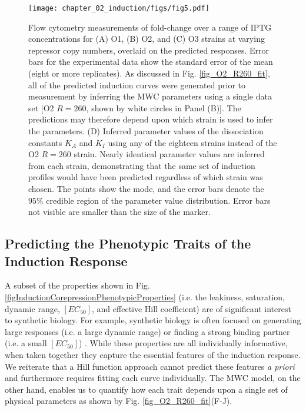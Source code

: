 \begin{figure}[h]
	\centering \texttt{[image: chapter\_02\_induction/figs/fig5.pdf]}
	\caption[Comparison of predictions against measured and inferred data.]{
	Flow cytometry measurements of fold-change over a range of IPTG concentrations
	for (A) O1, (B) O2, and (C) O3 strains at
	varying repressor copy numbers, overlaid on the predicted responses. Error bars
	for the experimental data show the standard error of the mean (eight or more
	replicates). As discussed in Fig. \ref{fig_O2_R260_fit}, all of the predicted
	induction curves were generated prior to measurement by inferring the MWC
	parameters using a single data set [O2 $R=260$, shown by white circles in Panel
	(B)]. The predictions may therefore depend upon which strain is used to
	infer the parameters. (D) Inferred parameter values of the
	dissociation constants $K_A$ and $K_I$ using any of the eighteen strains
	instead of the O2 $R=260$ strain. Nearly identical parameter values are
	inferred from each strain, demonstrating that the same set of induction
	profiles would have been predicted regardless of which strain was chosen. The
	points show the mode, and the error bars denote the $95\%$ credible region of
	the parameter value distribution. Error bars not visible are smaller than the
	size of the marker.} 
	\label{fig_O2_R260_pred_data}
\end{figure}

\subsection{Predicting the Phenotypic Traits of the Induction Response}
A subset of the
properties shown in Fig. \ref{figInductionCorepressionPhenotypicProperties} (i.e.
the leakiness, saturation, dynamic range, $[EC_{50}]$, and effective Hill
coefficient) are of significant interest to synthetic biology. For example, synthetic biology is often
focused on generating large responses (i.e. a large dynamic range) or finding a
strong binding partner (i.e. a small $[EC_{50}]$) \cite{Brophy2014, Shis2014}.
While these properties are all individually informative, when taken together
they capture the essential features of the induction response. We reiterate that
a Hill function approach cannot predict these features \textit{a priori} and
furthermore requires fitting each curve individually. The MWC model, on the
other hand, enables us to quantify how each trait depends upon a single set of
physical parameters as shown by Fig. \ref{fig_O2_R260_fit}(F-J).

